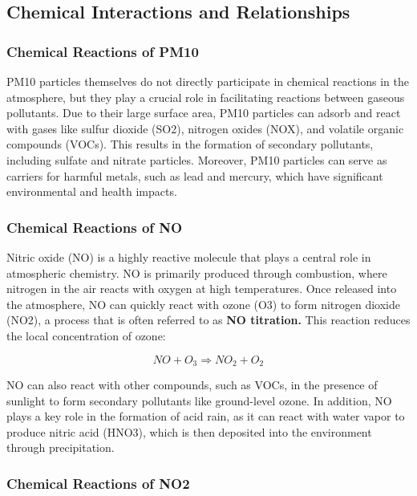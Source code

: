 \documentclass{modeleRapport}
\begin{document}
\subsection{Chemical Interactions and Relationships}

\subsubsection{Chemical Reactions of PM10}

PM10 particles themselves do not directly participate in chemical reactions in the atmosphere, but they play a crucial 
role in facilitating reactions between gaseous pollutants. Due to their large surface area, PM10 particles can adsorb 
and react with gases like sulfur dioxide (SO2), nitrogen oxides (NOX), and volatile organic compounds (VOCs). 
This results in the formation of secondary pollutants, including sulfate and nitrate particles.
Moreover, PM10 particles can serve as carriers for harmful metals, such as lead and mercury, which have significant 
environmental and health impacts.\\

\subsubsection{Chemical Reactions of NO}

Nitric oxide (NO) is a highly reactive molecule that plays a central role in atmospheric chemistry. NO is primarily 
produced through combustion, where nitrogen in the air reacts with oxygen at high temperatures. Once released into 
the atmosphere, NO can quickly react with ozone (O3) to form nitrogen dioxide (NO2), a process that is often referred to as 
\textbf{NO titration.} This reaction reduces the local concentration of ozone:

$$NO + O_3 \Rightarrow NO_2 + O_2$$

NO can also react with other compounds, such as VOCs, in the presence of sunlight to form secondary pollutants like 
ground-level ozone. In addition, NO plays a key role in the formation of acid rain, as it can react with water vapor 
to produce nitric acid (HNO3), which is then deposited into the environment through precipitation.\\

\subsubsection{Chemical Reactions of NO2}
\end{document}

